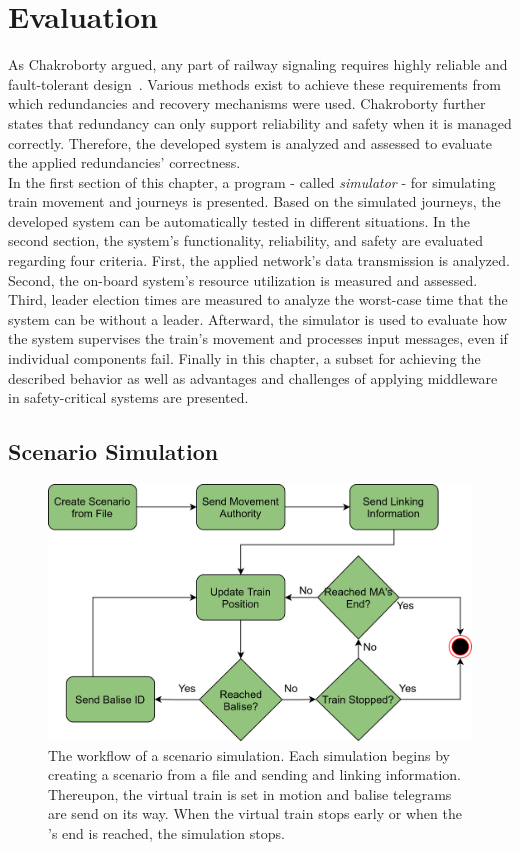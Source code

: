 \chapter{Evaluation}
\label{cpt:evaluation}

As Chakroborty argued, any part of railway signaling requires highly reliable and fault-tolerant design~\cite{ChakrabortyFaultTolerantRailway}.
Various methods exist to achieve these requirements from which redundancies and recovery mechanisms were used.
Chakroborty further states that redundancy can only support reliability and safety when it is managed correctly.
Therefore, the developed system is analyzed and assessed to evaluate the applied redundancies' correctness.
\\

In the first section of this chapter, a program - called \textit{simulator} - for simulating train movement and journeys is presented.
Based on the simulated journeys, the developed system can be automatically tested in different situations.
In the second section, the system's functionality, reliability, and safety are evaluated regarding four criteria.
First, the applied network's data transmission is analyzed.
Second, the on-board system's resource utilization is measured and assessed.
Third, leader election times are measured to analyze the worst-case time that the system can be without a leader.
Afterward, the simulator is used to evaluate how the system supervises the train's movement and processes input messages, even if individual components fail.
Finally in this chapter, a  subset for achieving the described behavior as well as advantages and challenges of applying  middleware in safety-critical systems are presented.


\section{Scenario Simulation}
\label{subsec:ScenarioSimulation}

\begin{figure}[!htb]
	\centering
	\includegraphics[width=0.8\linewidth]{images/SimulatorWorkflow}
	\caption{The workflow of a scenario simulation. Each simulation begins by creating a scenario from a file and sending  and linking information. Thereupon, the virtual train is set in motion and balise telegrams are send on its way. When the virtual train stops early or when the 's end is reached, the simulation stops.}
	\label{fig:SimulatorWorkflow}
\end{figure}


